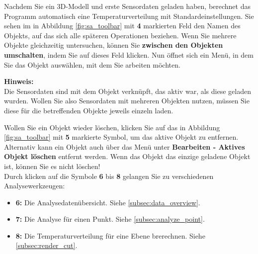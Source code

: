 \documentclass[10pt,a5paper,twoside,titlepage]{scrartcl}
\newenvironment{myshaded}
  {\def\FrameCommand{\colorbox{shadecolor}}
    \MakeFramed {\advance\hsize-\width \FrameRestore}}
 {\endMakeFramed}
\newenvironment{hinweis}
  {\colorlet{shadecolor}{black!20}%
      \begin{myshaded}
      \begin{minipage}{\linewidth}
	  \hangindent 20pt  
      \textbf{Hinweis:}\\
      }
  {\end{minipage}\end{myshaded}}
\begin{document}
	Nachdem Sie ein 3D-Modell und erste Sensordaten geladen haben, berechnet das Programm automatisch eine Temperaturverteilung mit Standardeinstellungen. Sie sehen im in Abbildung \ref{fig:sa_toolbar} mit \textbf{4} markierten Feld den Namen des Objekts, auf das sich alle späteren Operationen beziehen. Wenn Sie mehrere Objekte gleichzeitig untersuchen, können Sie \textbf{zwischen den Objekten umschalten}, indem Sie auf dieses Feld klicken. Nun öffnet sich ein Menü, in dem Sie das Objekt auswählen, mit dem Sie arbeiten möchten.\\
	\begin{hinweis}
	Die Sensordaten sind mit dem Objekt verknüpft, das aktiv war, als diese geladen wurden. Wollen Sie also Sensordaten mit mehreren Objekten nutzen, müssen Sie diese für die betreffenden Objekte jeweils einzeln laden.
	\end{hinweis}
	Wollen Sie ein Objekt wieder löschen, klicken Sie auf das in Abbildung \ref{fig:sa_toolbar} mit \textbf{5} markierte Symbol, um das aktive Objekt zu entfernen. Alternativ kann ein Objekt auch über das Menü unter \textbf{Bearbeiten - Aktives Objekt löschen} entfernt werden.  Wenn das Objekt das einzige geladene Objekt ist, können Sie es nicht löschen!\\
	Durch klicken auf die Symbole \textbf{6} bis \textbf{8} gelangen Sie zu verschiedenen Analysewerkzeugen:
	\begin{itemize}
	\item \textbf{6:} Die Analysedatenübersicht. Siehe \ref{subsec:data_overview}.
	\item \textbf{7:} Die Analyse für einen Punkt. Siehe \ref{subsec:analyze_point}.
	\item \textbf{8:} Die Temperaturverteilung für eine Ebene brerechnen. Siehe \ref{subsec:render_cut}.
	\end{itemize}
\end{document}
